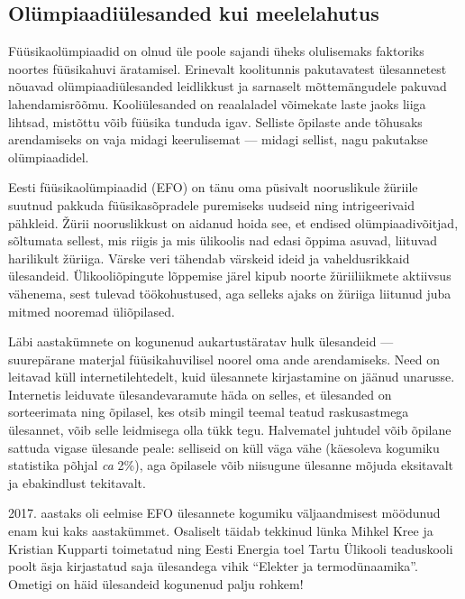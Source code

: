 \documentclass[11pt, twoside]{article}
\begin{document}
{\newpage
\subsection*{Olümpiaadiülesanded kui meelelahutus}
{
Füüsikaolümpiaadid on olnud üle poole sajandi üheks olulisemaks faktoriks noortes füüsikahuvi äratamisel.
Erinevalt koolitunnis pakutavatest ülesannetest nõuavad olümpiaadiülesanded leidlikkust ja sarnaselt
mõttemängudele pakuvad lahendamisrõõmu. Kooliülesanded on reaalaladel võimekate laste jaoks liiga lihtsad, mistõttu
võib füüsika tunduda igav. Selliste õpilaste ande tõhusaks arendamiseks on vaja
midagi keerulisemat --- midagi sellist, nagu pakutakse olümpiaadidel.

Eesti füüsikaolümpiaadid (EFO) on tänu oma püsivalt nooruslikule žüriile suutnud pakkuda füüsikasõpradele puremiseks
uudseid ning intrigeerivaid pähkleid.
Žürii nooruslikkust on aidanud hoida see, et endised olümpiaadivõitjad, sõltumata sellest, mis riigis ja mis ülikoolis nad edasi õppima asuvad, liituvad harilikult žüriiga.
Värske veri tähendab värskeid ideid ja vaheldusrikkaid ülesandeid.
Ülikooliõpingute lõppemise järel kipub noorte žüriiliikmete aktiivsus vähenema, sest tulevad töökohustused,
aga selleks ajaks on žüriiga liitunud juba mitmed nooremad üliõpilased.

Läbi aastakümnete on kogunenud aukartustäratav hulk ülesandeid ---
suurepärane materjal füüsikahuvilisel noorel oma ande arendamiseks.
Need on leitavad küll internetilehtedelt, kuid ülesannete
kirjastamine on jäänud unarusse. Internetis leiduvate
ülesandevaramute häda on selles, et ülesanded on
sorteerimata ning õpilasel, kes otsib mingil teemal
teatud raskusastmega ülesannet, võib selle leidmisega olla tükk tegu.
Halvematel juhtudel võib õpilane sattuda vigase ülesande peale:
selliseid on küll väga vähe (käesoleva kogumiku statistika põhjal \textit{ca} 2\%),
aga õpilasele võib niisugune ülesanne mõjuda eksitavalt ja ebakindlust tekitavalt.

2017. aastaks oli eelmise EFO ülesannete kogumiku väljaandmisest möödunud enam kui kaks aastakümmet.
Osaliselt täidab tekkinud lünka Mihkel Kree ja Kristian Kupparti toimetatud ning Eesti Energia toel Tartu Ülikooli
teaduskooli poolt äsja kirjastatud saja ülesandega vihik ``Elekter ja termodünaamika''. Ometigi on häid
ülesandeid kogunenud palju rohkem!

}}
\end{document}
